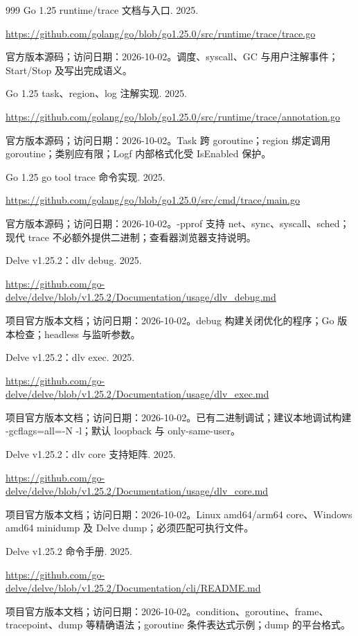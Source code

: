 \documentclass[UTF8,fontset=fandol,openany,11pt]{ctexbook}
\begin{document}
\begin{thebibliography}{999}
 Go 1.25 runtime/trace 文档与入口. 2025.\par
\url{https://github.com/golang/go/blob/go1.25.0/src/runtime/trace/trace.go}\par
{\small 官方版本源码；访问日期：2026-10-02。调度、syscall、GC 与用户注解事件；Start/\allowbreak{}Stop 及写出完成语义。}

 Go 1.25 task、region、log 注解实现. 2025.\par
\url{https://github.com/golang/go/blob/go1.25.0/src/runtime/trace/annotation.go}\par
{\small 官方版本源码；访问日期：2026-10-02。Task 跨 goroutine；region 绑定调用 goroutine；类别应有限；Logf 内部格式化受 IsEnabled 保护。}

 Go 1.25 go tool trace 命令实现. 2025.\par
\url{https://github.com/golang/go/blob/go1.25.0/src/cmd/trace/main.go}\par
{\small 官方版本源码；访问日期：2026-10-02。-\allowbreak{}pprof 支持 net、sync、syscall、sched；现代 trace 不必额外提供二进制；查看器浏览器支持说明。}

 Delve v1.25.2：dlv debug. 2025.\par
\url{https://github.com/go-delve/delve/blob/v1.25.2/Documentation/usage/dlv_debug.md}\par
{\small 项目官方版本文档；访问日期：2026-10-02。debug 构建关闭优化的程序；Go 版本检查；headless 与监听参数。}

 Delve v1.25.2：dlv exec. 2025.\par
\url{https://github.com/go-delve/delve/blob/v1.25.2/Documentation/usage/dlv_exec.md}\par
{\small 项目官方版本文档；访问日期：2026-10-02。已有二进制调试；建议本地调试构建 -\allowbreak{}gcflags=all=-\allowbreak{}N -\allowbreak{}l；默认 loopback 与 only-\allowbreak{}same-\allowbreak{}user。}

 Delve v1.25.2：dlv core 支持矩阵. 2025.\par
\url{https://github.com/go-delve/delve/blob/v1.25.2/Documentation/usage/dlv_core.md}\par
{\small 项目官方版本文档；访问日期：2026-10-02。Linux amd64/\allowbreak{}arm64 core、Windows amd64 minidump 及 Delve dump；必须匹配可执行文件。}

 Delve v1.25.2 命令手册. 2025.\par
\url{https://github.com/go-delve/delve/blob/v1.25.2/Documentation/cli/README.md}\par
{\small 项目官方版本文档；访问日期：2026-10-02。condition、goroutine、frame、tracepoint、dump 等精确语法；goroutine 条件表达式示例；dump 的平台格式。}


\end{thebibliography}
\end{document}
